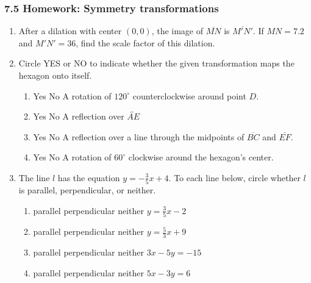 \documentclass[12pt, twoside]{article}
\begin{document}
\subsubsection*{7.5 Homework: Symmetry transformations}
 \begin{enumerate}

  \item After a dilation with center $(0,0)$, the image of $\overline{MN}$ is $\overline{M'N'}$. If $MN=7.2$ and $M'N'=36$, find the scale factor of this dilation. \vspace{3cm}

  \item Circle YES or NO to indicate whether the given transformation maps the hexagon onto itself.
  \vspace{0.5cm}
  \begin{multicols}{2}
    \begin{enumerate}
    \item Yes \quad No \quad A rotation of $120^\circ$ counterclockwise around point $D$.
     \item Yes \quad No \quad A reflection over $\overleftrightarrow{AE}$
     \item Yes \quad No \quad A reflection over a line through the midpoints of  $\overline{BC}$ and $\overline{EF}$.
     \item Yes \quad No \quad A rotation of $60^\circ$ clockwise around the hexagon's center.
     \end{enumerate}
   \begin{center}
     \end{center}
   \end{multicols} \vspace{0.5cm}

  \item The line $l$ has the equation $y=-\frac{3}{5}x+4$. To each line below, circle whether $l$ is parallel, perpendicular, or neither.
    \begin{enumerate}
      \item parallel \quad perpendicular \quad neither \qquad $y=\frac{3}{5}x-2$
      \vspace{0.5cm}
      \item parallel \quad perpendicular \quad neither \qquad $y=\frac{5}{3}x+9$
      \vspace{0.5cm}
      \item parallel \quad perpendicular \quad neither \qquad $3x-5y=-15$
      \vspace{2cm}
      \item parallel \quad perpendicular \quad neither \qquad $5x-3y=6$
      \vspace{1.7cm}
    \end{enumerate}


\end{enumerate}
\end{document}
